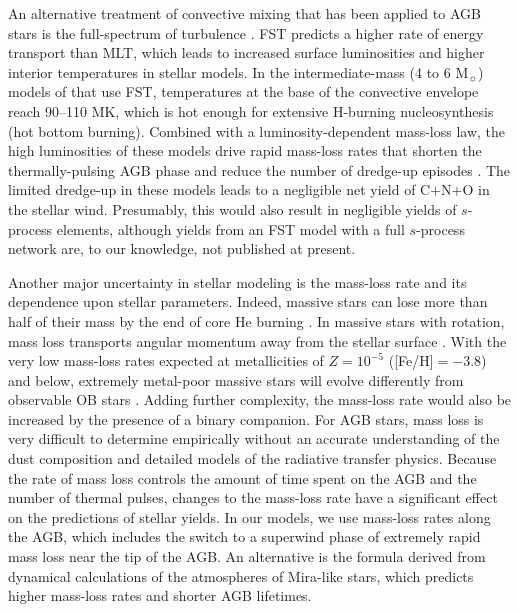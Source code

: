 An alternative treatment of convective mixing that has been applied to AGB stars is the full-spectrum of turbulence \citep[FST;][]{Canuto:1991bj,Canuto:1996cq}. FST predicts a higher rate of energy transport than MLT, which leads to increased surface luminosities and higher interior temperatures in stellar models. In the intermediate-mass (4 to 6 M$_\sun$) models of \citet{Ventura:2008iv} that use FST, temperatures at the base of the convective envelope reach 90--110 MK, which is hot enough for extensive H-burning nucleosynthesis (hot bottom burning). Combined with a luminosity-dependent mass-loss law, the high luminosities of these models drive rapid mass-loss rates that shorten the thermally-pulsing AGB phase and reduce the number of dredge-up episodes \citep{Ventura:2005ge,Ventura:2013ct}. The limited dredge-up in these models leads to a negligible net yield of C+N+O in the stellar wind. Presumably, this would also result in negligible yields of $s$-process elements, although yields from an FST model with a full $s$-process network are, to our knowledge, not published at present.

Another major uncertainty in stellar modeling is the mass-loss rate and its dependence upon stellar parameters. Indeed, massive stars can lose more than half of their mass by the end of core He burning \citep{Chiosi:1986df}. In massive stars with rotation, mass loss transports angular momentum away from the stellar surface \citep[][to which we refer for details of the mass-loss prescription used in our massive star models]{Hirschi:2007br}. With the very low mass-loss rates expected at metallicities of $Z=10^{-5}$ ([Fe/H]$=-3.8$) and below, extremely metal-poor massive stars will evolve differently from observable OB stars \citep{Maeder:2000br}. Adding further complexity, the mass-loss rate would also be increased by the presence of a binary companion. For AGB stars, mass loss is very difficult to determine empirically without an accurate understanding of the dust composition and detailed models of the radiative transfer physics. Because the rate of mass loss controls the amount of time spent on the AGB and the number of thermal pulses, changes to the mass-loss rate have a significant effect on the predictions of stellar yields. In our models, we use \citet{Vassiliadis:1993jk} mass-loss rates along the AGB, which includes the switch to a superwind phase of extremely rapid mass loss near the tip of the AGB. An alternative is the \citet{Bloecker:1995ui} formula derived from dynamical calculations of the atmospheres of Mira-like stars, which predicts higher mass-loss rates and shorter AGB lifetimes.

